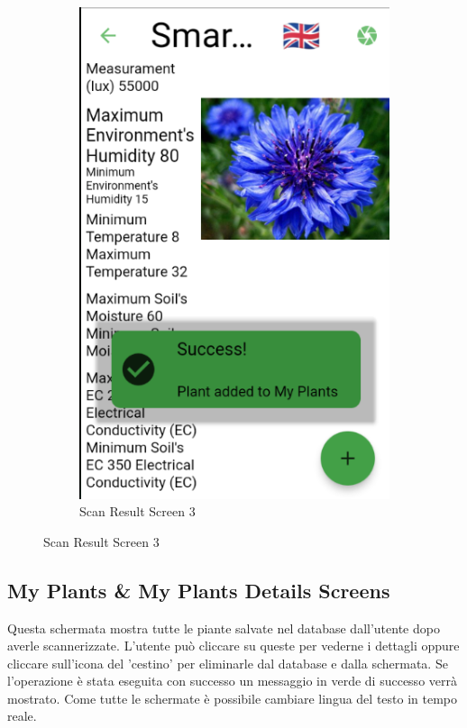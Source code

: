 \documentclass[a4paper,12pt]{report}
\begin{document}
\begin{figure}[H]
\begin{subfigure}{0.3\textwidth}
		\includegraphics[width=\textwidth]{./images/scan_result/scan_result_screen3.png}
		\caption{Scan Result Screen 3}
		\label{fig:scan_result3}
	\end{subfigure}
\end{figure}

\subsection{My Plants \& My Plants Details Screens}

\textsf{\small Questa schermata mostra tutte le piante salvate nel database dall'utente dopo averle scannerizzate.}
\textsf{\small L'utente può cliccare su queste per vederne i dettagli oppure cliccare sull'icona del 'cestino' per eliminarle dal database e dalla schermata.}
\textsf{\small Se l'operazione è stata eseguita con successo un messaggio in verde di successo verrà mostrato.}
\textsf{\small Come tutte le schermate è possibile cambiare lingua del testo in tempo reale.}
\end{document}
